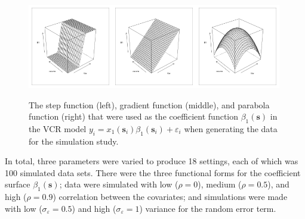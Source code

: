 \documentclass[authoryear,review, 12pt]{elsarticle}
\begin{document}
\begin{figure}
    \includegraphics[width=0.33\textwidth]{0_Users_wesley_git_gwr_figures_simulation_step.pdf}\includegraphics[width=0.33\textwidth]{1_Users_wesley_git_gwr_figures_simulation_gradient.pdf}\includegraphics[width=0.33\textwidth]{2_Users_wesley_git_gwr_figures_simulation_parabola.pdf}
    \protect\caption{The step function (left), gradient function (middle), and parabola
function (right) that were used as the coefficient function $\beta_{1}(\bm{s})$
in the VCR model $y_{i}=x_{1}(\bm{s}_{i})\beta_{1}(\bm{s}_{i})+\varepsilon_{i}$
when generating the data for the simulation study.\label{fig:simulation-coefficient-functions}}
\end{figure}

In total, three parameters were varied to produce 18 settings, each
of which was 100 simulated data sets. There were the three functional
forms for the coefficient surface $\beta_{1}(\bm{s})$; data were
simulated with low ($\rho=0$), medium ($\rho=0.5$), and high ($\rho=0.9$)
correlation between the covariates; and simulations were made with
low ($\sigma_{\varepsilon}=0.5$) and high ($\sigma_{\varepsilon}=1$)
variance for the random error term.
\end{document}
